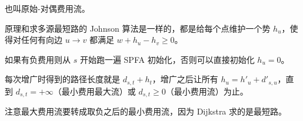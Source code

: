 也叫原始-对偶费用流。

原理和求多源最短路的 Johnson 算法是一样的，都是给每个点维护一个势 $h_u$，使得对任何有向边 $u\to v$ 都满足 $w + h_u - h_v \ge 0$。

如果有负费用则从 $s$ 开始跑一遍 SPFA 初始化，否则可以直接初始化 $h_u = 0$。

每次增广时得到的路径长度就是 $d_{s, t} + h_t$，增广之后让所有 $h_u = h'_u + d'_{s, u}$，直到 $d_{s, t} = +\infty$（最小费用最大流）或 $d_{s, t} \ge 0$（最小费用流）为止。

注意最大费用流要转成取负之后的最小费用流，因为 Dijkstra 求的是最短路。

\inputminted{cpp}{../src/graph/dijkstra费用流.cpp}
